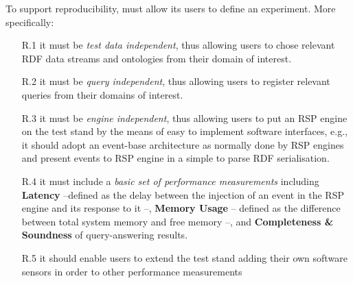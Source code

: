 To support reproducibility, \name must allow its users to define an experiment. More specifically: 
\begin{enumerate}
\item[R.1] it must be \textit{test data independent}, thus allowing users to chose relevant RDF data streams and ontologies from their domain of interest. %
\item[R.2] it must be \textit{query independent}, thus allowing users to register relevant queries from their domains of interest. %
\item[R.3] it must be \textit{engine independent}, thus allowing users to put an RSP engine on the test stand by the means of easy to implement software interfaces, e.g., it should adopt an event-base architecture as normally done by RSP engines and present events to RSP engine in a simple to parse RDF serialisation. %
\item[R.4] it must include a \textit{basic set of performance measurements} \cite{DBLP:conf/esws/ScharrenbachUMVB13} including \textbf{Latency} --defined as the delay between the injection of an event in the RSP engine and its response to it --, \textbf{Memory Usage} -- defined as the difference between total system memory and free memory --, and \textbf{Completeness \& Soundness} of query-answering results.  %
\item[R.5] it should enable users to extend the test stand adding their own software sensors in order to other performance measurements %
\end{enumerate}


